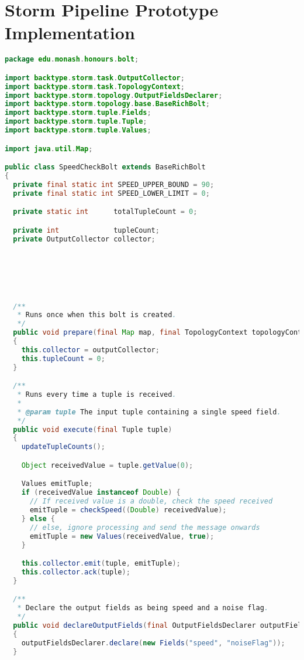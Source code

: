 \clearpage
\chapter{Storm Pipeline Prototype Implementation}
\label{lst:storm}

\begin{lstlisting}[language=java,caption=edu.monash.honours.bolt.SpeedCheckBolt (Java),label=storm-bolt]
package edu.monash.honours.bolt;

import backtype.storm.task.OutputCollector;
import backtype.storm.task.TopologyContext;
import backtype.storm.topology.OutputFieldsDeclarer;
import backtype.storm.topology.base.BaseRichBolt;
import backtype.storm.tuple.Fields;
import backtype.storm.tuple.Tuple;
import backtype.storm.tuple.Values;

import java.util.Map;

public class SpeedCheckBolt extends BaseRichBolt
{
  private final static int SPEED_UPPER_BOUND = 90;
  private final static int SPEED_LOWER_LIMIT = 0;

  private static int      totalTupleCount = 0;

  private int             tupleCount;
  private OutputCollector collector;






  /**
   * Runs once when this bolt is created.
   */
  public void prepare(final Map map, final TopologyContext topologyContext, final OutputCollector outputCollector)
  {
    this.collector = outputCollector;
    this.tupleCount = 0;
  }

  /**
   * Runs every time a tuple is received.
   *
   * @param tuple The input tuple containing a single speed field.
   */
  public void execute(final Tuple tuple)
  {
    updateTupleCounts();

    Object receivedValue = tuple.getValue(0);

    Values emitTuple;
    if (receivedValue instanceof Double) {
      // If received value is a double, check the speed received
      emitTuple = checkSpeed((Double) receivedValue);
    } else {
      // else, ignore processing and send the message onwards
      emitTuple = new Values(receivedValue, true);
    }

    this.collector.emit(tuple, emitTuple);
    this.collector.ack(tuple);
  }

  /**
   * Declare the output fields as being speed and a noise flag.
   */
  public void declareOutputFields(final OutputFieldsDeclarer outputFieldsDeclarer)
  {
    outputFieldsDeclarer.declare(new Fields("speed", "noiseFlag"));
  }



\end{lstlisting}
